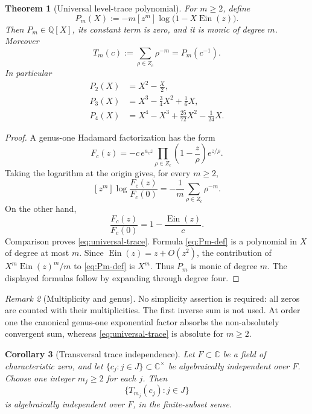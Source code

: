 \documentclass[11pt]{article}
\theoremstyle{keio}
\newtheorem{theorem}{Theorem}[section]
\newtheorem{corollary}[theorem]{Corollary}
\theoremstyle{definition}
\theoremstyle{remark}
\newtheorem{remark}[theorem]{Remark}
\newcommand{\Q}{\mathbb Q}
\newcommand{\C}{\mathbb C}
\newcommand{\Ein}{\operatorname{Ein}}
\begin{document}
\begin{theorem}[Universal level-trace polynomial]
\label{thm:universal-trace}
For \(m\ge2\), define
\begin{equation}\label{eq:Pm-def}
 P_m(X):=-m[z^m]\log\bigl(1-X\Ein(z)\bigr).
\end{equation}
Then \(P_m\in\Q[X]\), its constant term is zero, and it is monic of degree
\(m\).  Moreover
\begin{equation}\label{eq:universal-trace}
 \boxed{\displaystyle
 T_m(c):=\sum_{\rho\in Z_c}\rho^{-m}=P_m(c^{-1}).}
\end{equation}
In particular
\begin{align}
 P_2(X)&=X^2-\frac X2,\label{eq:P2}\\
 P_3(X)&=X^3-\frac34X^2+\frac16X,\label{eq:P3}\\
 P_4(X)&=X^4-X^3+\frac{25}{72}X^2-\frac1{24}X.\label{eq:P4}
\end{align}
\end{theorem}

\begin{proof}
A genus-one Hadamard factorization has the form
\[
 F_c(z)=-c\,e^{a_cz}
 \prod_{\rho\in Z_c}
 \left(1-\frac z\rho\right)e^{z/\rho}.
\]
Taking the logarithm at the origin gives, for every \(m\ge2\),
\[
 [z^m]\log\frac{F_c(z)}{F_c(0)}
 =-\frac1m\sum_{\rho\in Z_c}\rho^{-m}.
\]
On the other hand,
\[
 \frac{F_c(z)}{F_c(0)}=1-\frac{\Ein(z)}c.
\]
Comparison proves \eqref{eq:universal-trace}.  Formula
\eqref{eq:Pm-def} is a polynomial in \(X\) of degree at most \(m\).  Since
\(\Ein(z)=z+O(z^2)\), the contribution of
\(X^m\Ein(z)^m/m\) to \eqref{eq:Pm-def} is \(X^m\).  Thus \(P_m\) is monic
of degree \(m\).  The displayed formulas follow by expanding through degree
four.
\end{proof}

\begin{remark}[Multiplicity and genus]
No simplicity assertion is required: all zeros are counted with their
multiplicities.  The first inverse sum is not used.  At order one the
canonical genus-one exponential factor absorbs the non-absolutely convergent
sum, whereas \eqref{eq:universal-trace} is absolute for \(m\ge2\).
\end{remark}

\begin{corollary}[Transversal trace independence]
\label{cor:transversal}
Let \(F\subset\C\) be a field of characteristic zero, and let
\(\{c_j:j\in J\}\subset\C^\times\) be algebraically independent over \(F\).
Choose one integer \(m_j\ge2\) for each \(j\).  Then
\[
 \{T_{m_j}(c_j):j\in J\}
\]
is algebraically independent over \(F\), in the finite-subset sense.
\end{corollary}
\end{document}
